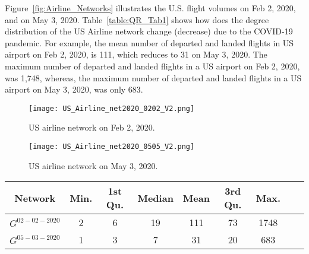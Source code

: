 \documentclass[review]{elsarticle}
\begin{document}
Figure~\ref{fig:Airline_Networks} illustrates the U.S. flight volumes on Feb 2, 2020, and on May 3, 2020. Table~\ref{table:QR_Tab1} shows how does the degree distribution of the US Airline network change (decrease) due to the COVID-19 pandemic. For example, the mean number of departed and landed flights in US airport on Feb 2, 2020, is 111, which reduces to 31 on May 3, 2020. The maximum number of departed and landed flights in a US airport on Feb 2, 2020, was 1,748, whereas,  the maximum number of departed and landed flights in a US airport on May 3, 2020, was only 683.


\begin{figure*}[!ht]
     \centering
     \begin{subfigure}[b]{0.55\textwidth}
         \centering
         \vspace*{-15mm}
    \texttt{[image: US\_Airline\_net2020\_0202\_V2.png]}
         \caption{US airline network on Feb 2, 2020.}
         \label{fig:USnetA}
     \end{subfigure}
     \hfill
     \begin{subfigure}[b]{0.44\textwidth}
         \centering
         \texttt{[image: US\_Airline\_net2020\_0505\_V2.png]}
         \caption{US airline network on May 3, 2020.}
         \label{fig:USnetB}
     \end{subfigure}
        \caption{Impact of COVID-19 on US airlines. Red points represent nodes (airports) and green lines represent edges. (a) Shows normal US airline network with 340 nodes and 18,805 edges.  
        (b) ) Represents reduced US airline network with 319 nodes and 4,980 edges.  }
     	\label{fig:Airline_Networks}
\end{figure*}






\begin{table*}[!ht]
\caption{Degree distribution of U.S. Airline networks on Feb 2, 2020 and on May 3, 2020.}
	\label{table:QR_Tab1}
	\centering
	\begin{tabular}{c | *{7}{c} r}  
	\hline
      Network  	       &   Min.& 1st Qu. & Median &   Mean & 3rd Qu.  &  Max. \\
      
	\hline
    $G^{02-02-2020}$ &   2 &    6 &   19 &  111   &  73 & 1748  \\ 
		\hline
    $G^{05-03-2020}$   & 1 &   3  &   7 &   31 &   20 &   683  \\ 
 

	 \hline	

\end{tabular}
\end{table*}
\end{document}
